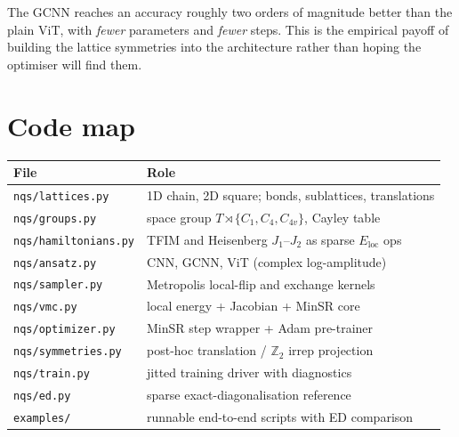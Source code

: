 \documentclass[11pt,a4paper]{article}
\newcommand{\Z}{\mathbb{Z}}
\newcommand{\Eloc}{E_{\mathrm{loc}}}
\theoremstyle{definition}
\theoremstyle{plain}
\begin{document}
The GCNN reaches an accuracy roughly two orders of magnitude better than the
plain ViT, with \emph{fewer} parameters and \emph{fewer} steps. This is the
empirical payoff of building the lattice symmetries into the architecture
rather than hoping the optimiser will find them.

\section{Code map}

\begin{center}\small
\begin{tabular}{ll}
\toprule
File & Role \\
\midrule
\texttt{nqs/lattices.py}     & 1D chain, 2D square; bonds, sublattices, translations\\
\texttt{nqs/groups.py}       & space group $T \rtimes \{C_{1}, C_{4}, C_{4v}\}$, Cayley table\\
\texttt{nqs/hamiltonians.py} & TFIM and Heisenberg $J_{1}$--$J_{2}$ as sparse $\Eloc$ ops\\
\texttt{nqs/ansatz.py}       & CNN, GCNN, ViT (complex log-amplitude)\\
\texttt{nqs/sampler.py}      & Metropolis local-flip and exchange kernels\\
\texttt{nqs/vmc.py}          & local energy + Jacobian + MinSR core\\
\texttt{nqs/optimizer.py}    & MinSR step wrapper + Adam pre-trainer\\
\texttt{nqs/symmetries.py}   & post-hoc translation / $\Z_{2}$ irrep projection\\
\texttt{nqs/train.py}        & jitted training driver with diagnostics\\
\texttt{nqs/ed.py}           & sparse exact-diagonalisation reference\\
\texttt{examples/}           & runnable end-to-end scripts with ED comparison\\
\bottomrule
\end{tabular}
\end{center}

\end{document}
